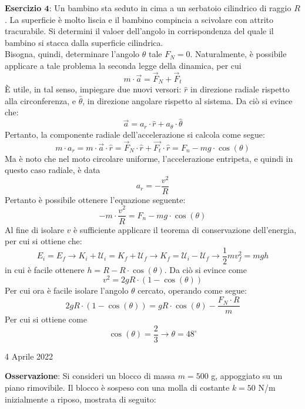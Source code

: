 \documentclass[a4paper]{extarticle}
\begin{document}
\vspace{1em}
\noindent
\textbf{Esercizio $\boldsymbol{4}$}: Un bambino sta seduto in cima a un serbatoio cilindrico di raggio $R$. La superficie è molto liscia e il bambino compincia a scivolare con attrito tracurabile. Si determini il valoer dell'angolo in corrispondenza del quale il bambino si stacca dalla superficie cilindrica.\\
Bisogna, quindi, determinare l'angolo $\theta$ tale $F_N=0$. Naturalmente, è possibile applicare a tale problema la seconda legge della dinamica, per cui
\[m \cdot \vec a = \vec F_N + \vec F_t\]
È utile, in tal senso, impiegare due nuovi versori: $\hat r$ in direzione radiale rispetto alla circonferenza, e $\hat \theta$, in direzione angolare rispetto al sistema. Da ciò si evince che:
\[\vec a = a_r \cdot \hat{r} + a_\theta \cdot \hat{\theta}\]
Pertanto, la componente radiale dell'accelerazione si calcola come segue:
\[m \cdot a_r = m \cdot \vec a \cdot \hat{r} = \vec F_N \cdot \hat{r} + \vec{F_t} \cdot \hat{r} = F_n - mg \cdot \cos(\theta)\]
Ma è noto che nel moto circolare uniforme, l'accelerazione entripeta, e quindi in questo caso radiale, è data
\[a_r = - \frac{v^2}{R}\]
Pertanto è possibile ottenere l'equazione seguente:
\[-m \cdot \frac{v^2}{R} = F_n - mg \cdot \cos(\theta)\]
Al fine di isolare $v$ è sufficiente applicare il teorema di conservazione dell'energia, per cui si ottiene che:
\[E_i = E_f \longrightarrow K_i + \mathcal{U}_{i} = K_f + \mathcal{U}_f \longrightarrow K_f = \mathcal{U}_i - \mathcal{U}_f \longrightarrow \frac{1}{2}mv_f^2 = mgh\]
in cui è facile ottenere $h=R-R \cdot \cos(\theta)$. Da ciò si evince come
\[v^2 = 2g R \cdot (1-\cos(\theta))\]
Per cui ora è facile isolare l'angolo $\theta$ cercato, operando come segue:
\[2g R \cdot (1-\cos(\theta))=gR \cdot \cos(\theta) - \frac{F_N \cdot R}{m}\]
Per cui si ottiene come
\[\cos(\theta) = \frac{2}{3} \longrightarrow \theta=48^\circ\]

\newpage
\noindent
\begin{center}
  4 Aprile 2022
\end{center}
\textbf{Osservazione}: Si consideri un blocco di massa $m=500$ g, appoggiato su un piano rimovibile. Il blocco è sospeso con una molla di costante $k=50$ N/m inizialmente a riposo, mostrata di seguito:
\end{document}
